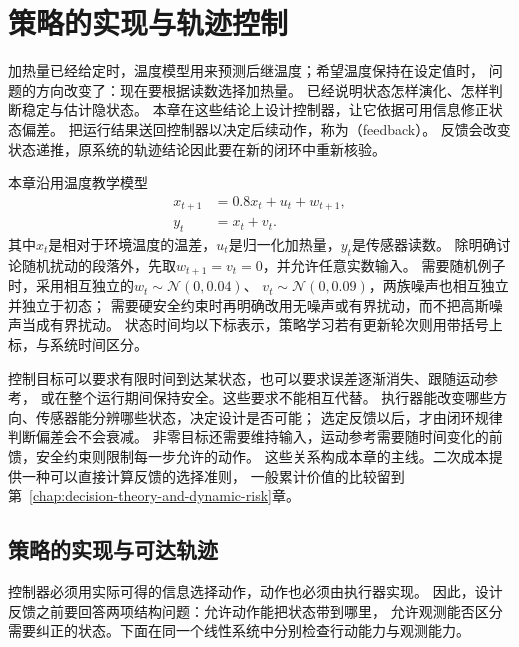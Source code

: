 \chapter{策略的实现与轨迹控制}
\label{chap:control-theory}
\label{chap:policy-realization-and-control}

加热量已经给定时，温度模型用来预测后继温度；希望温度保持在设定值时，
问题的方向改变了：现在要根据读数选择加热量。
已经说明状态怎样演化、怎样判断稳定与估计隐状态。
本章在这些结论上设计控制器，让它依据可用信息修正状态偏差。
把运行结果送回控制器以决定后续动作，称为（feedback）。
反馈会改变状态递推，原系统的轨迹结论因此要在新的闭环中重新核验。

本章沿用温度教学模型
\begin{equation}
  \begin{aligned}
    x_{t+1}&=0.8x_t+u_t+w_{t+1},\\
    y_t&=x_t+v_t.
  \end{aligned}
  \label{eq:control-temperature-model}
\end{equation}
其中$x_t$是相对于环境温度的温差，$u_t$是归一化加热量，$y_t$是传感器读数。
除明确讨论随机扰动的段落外，先取$w_{t+1}=v_t=0$，并允许任意实数输入。
需要随机例子时，采用相互独立的$w_t\sim\mathcal N(0,0.04)$、
$v_t\sim\mathcal N(0,0.09)$，两族噪声也相互独立并独立于初态；
需要硬安全约束时再明确改用无噪声或有界扰动，而不把高斯噪声当成有界扰动。
状态时间均以下标表示，策略学习若有更新轮次则用带括号上标，与系统时间区分。

控制目标可以要求有限时间到达某状态，也可以要求误差逐渐消失、跟随运动参考，
或在整个运行期间保持安全。这些要求不能相互代替。
执行器能改变哪些方向、传感器能分辨哪些状态，决定设计是否可能；
选定反馈以后，才由闭环规律判断偏差会不会衰减。
非零目标还需要维持输入，运动参考需要随时间变化的前馈，安全约束则限制每一步允许的动作。
这些关系构成本章的主线。二次成本提供一种可以直接计算反馈的选择准则，
一般累计价值的比较留到第~\ref{chap:decision-theory-and-dynamic-risk}章。

\section{策略的实现与可达轨迹}
\label{sec:control-feedback-structure}

控制器必须用实际可得的信息选择动作，动作也必须由执行器实现。
因此，设计反馈之前要回答两项结构问题：允许动作能把状态带到哪里，
允许观测能否区分需要纠正的状态。下面在同一个线性系统中分别检查行动能力与观测能力。

